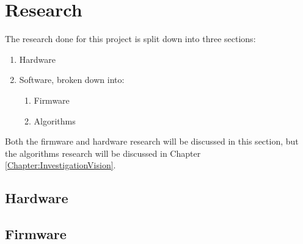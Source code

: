 \chapter{Research} \label{Chapter:Research}
The research done for this project is split down into three sections:
\begin{enumerate}
\item Hardware
\item Software, broken down into:
\begin{enumerate}
\item Firmware
\item Algorithms
\end{enumerate}
\end{enumerate}

Both the firmware and hardware research will be discussed in this section, but the algorithms research will be discussed in Chapter \ref{Chapter:InvestigationVision}. 

\section{Hardware}

\section{Firmware}